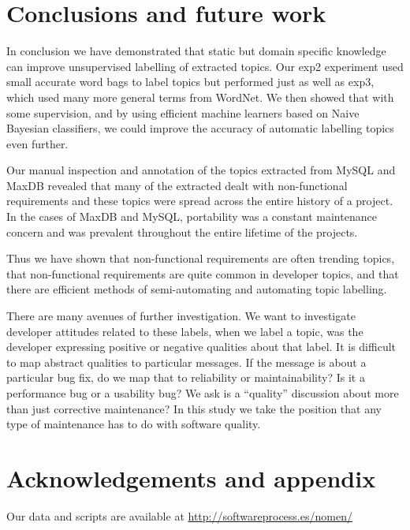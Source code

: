 \documentclass{acm_proc_article-sp}
\begin{document}
\section{Conclusions and future work}

%


In conclusion we have demonstrated that static but domain specific knowledge can improve unsupervised labelling of extracted topics. Our \textsf{exp2} experiment used small accurate word bags to label topics but performed just as well as \textsf{exp3}, which used many more general terms from WordNet. We then showed that with some supervision, and by using efficient machine learners based on Naive Bayesian classifiers, we could improve the accuracy of automatic labelling topics even further.

Our manual inspection and annotation of the topics extracted from MySQL and MaxDB revealed that many of the extracted dealt with non-functional requirements and these topics were spread across the entire history of a project. In the cases of MaxDB and MySQL, portability was a constant maintenance concern and was prevalent throughout the entire lifetime of the projects.

Thus we have shown that non-functional requirements are often trending topics, that non-functional requirements are quite common in developer topics, and that there are efficient methods of semi-automating and automating topic labelling.

There are many avenues of further investigation.  We want to investigate developer attitudes related to these labels, when we label a topic, was the developer expressing positive or negative qualities about that label.  It is difficult to map abstract qualities to particular messages. If the message is about a particular bug fix, do we map that to reliability or maintainability? Is it a performance bug or a usability bug? We ask is a ``quality'' discussion about more than just corrective maintenance? In this study we take the position that any type of maintenance has to do with software quality.



\section{Acknowledgements and appendix}
Our data and scripts are available at \url{http://softwareprocess.es/nomen/}


%

\end{document}
